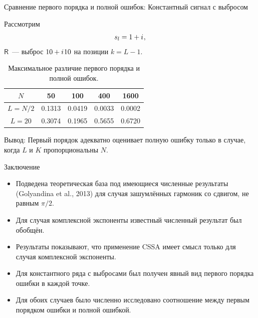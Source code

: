 \documentclass[ucs, notheorems, handout]{beamer}
\newcommand{\tX}[1]{\mathsf{#1}}
\newcommand{\iu}{{i\mkern1mu}}
\begin{document}
\begin{frame}{Сравнение первого порядка и полной ошибок: Константный сигнал с выбросом}

Рассмотрим
$$s_l = 1 + \iu,$$
$\tX{R}$~--- выброс $10 + \iu 10$ на позиции $k = L - 1$.

\begin{table}[H]
	\begin{center}
		\caption{Максимальное различие первого порядка и полной ошибок.}
		\label{tab:const_outl}
		\begin{tabular}{|c|c|c|c|c|}
			\hline
			$N$	& 50 & 100 & 400 & 1600 \\
			\hline
			$L = N / 2$ & 0.1313  & 0.0419  & 0.0033 & 0.0002 \\
			\hline
			$L = 20$ & 0.3074  & 0.1965  & 0.5655 & 0.6720 \\
			\hline
		\end{tabular}
	\end{center}
\end{table}

\alert{Вывод:} Первый порядок адекватно оценивает полную ошибку только в случае, когда $L$ и $K$ пропорциональны $N$.

\end{frame}

\begin{frame}{Заключение}
    \begin{itemize}
        \item Подведена теоретическая база под имеющиеся численные результаты (Golyandina et al., 2013) для случая зашумлённых гармоник со сдвигом, не равным $\pi / 2$.
        \item Для случая комплексной экспоненты известный численный результат был обобщён.
        \item Результаты показывают, что применение CSSA имеет смысл только для случая комплексной экспоненты.
        \item Для константного ряда с выбросами был получен явный вид первого порядка ошибки в каждой точке.
        \item Для обоих случаев было численно исследовано соотношение между первым порядком ошибки и полной ошибкой.  
    \end{itemize}
\end{frame}
\end{document}
